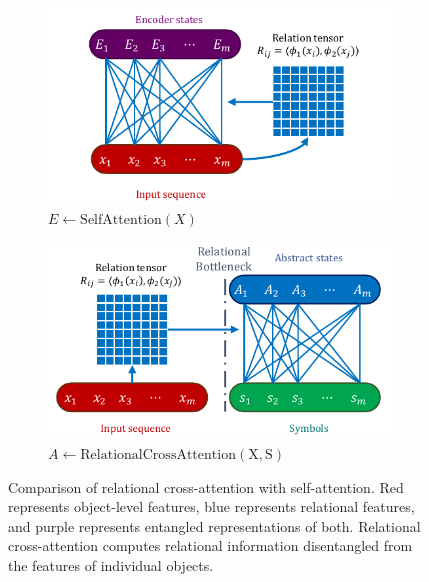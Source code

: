\begin{figure}
    \begin{subfigure}[b]{0.5\textwidth}
        \centering
        \includegraphics[width=\textwidth]{figures/self_attn_fig.pdf}
        \caption{$E \gets \mathrm{SelfAttention}(X)$}\label{fig:self_attention}
    \end{subfigure}
    \hfill
    \begin{subfigure}[b]{0.5\textwidth}
        \centering
        \includegraphics[width=\textwidth]{figures/rel_crossattn_fig.pdf}
        \caption{$A \gets \mathrm{RelationalCrossAttention(X, S)}$}\label{fig:relational_cross_attention}
    \end{subfigure}
    \caption{Comparison of relational cross-attention with self-attention. Red represents object-level features, blue represents relational features, and purple represents entangled representations of both. Relational cross-attention computes relational information disentangled from the features of individual objects.}\label{fig:attn_mechanisms}
\end{figure}

